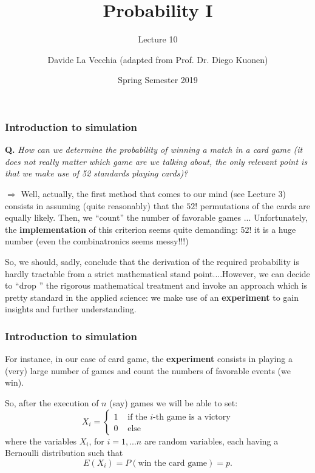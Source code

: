 \documentclass[notes=show,smaller,handout]{beamer}
\begin{document}
\title[S110015]{Probability I}
\subtitle{Lecture 10}
\author[La Vecchia]{Davide La Vecchia (adapted from Prof. Dr. Diego Kuonen)}
\date{Spring Semester 2019}
\maketitle


\begin{frame}
\frametitle{Introduction to simulation}

\color{red} \textbf{Q.} \textit{How can we determine the probability of winning a match in a card game (it does not really matter which game are we talking about, the only relevant point is that we make use of 52 standards playing cards)?} \color{black}

\vspace{1cm}

$\Rightarrow$  Well, actually, the first method that comes to our mind (see Lecture 3) consists in assuming (quite reasonably) that the 
$52!$ permutations of the cards are equally likely. Then, we ``count'' the number of favorable games ... \pause 
Unfortunately, the \textbf{implementation} of this criterion seems quite demanding: $52!$ it is a huge number (even the combinatronics
seems messy!!!)

\vspace{0.4cm}
So, we should, sadly, conclude that  the derivation of the required probability is hardly tractable from a strict mathematical stand point....However, 
we can decide to ``drop '' the rigorous mathematical treatment and invoke an approach which is pretty standard
in the applied science: we make use of an \textbf{experiment} to gain insights and further understanding.


\end{frame}


\begin{frame}
\frametitle{Introduction to simulation}

For instance,  in our case of card game, the \textbf{experiment} consists in playing a (very) large number of games and count the numbers of favorable events (we win).

\vspace{0.4cm}

So, after the execution of $n$ (say) games we will be able to set:
$$
X_i = \left\{\begin{array}{ll}
1& \mbox{ if the $i$-th game is a victory}\\
0 & \mbox{ else}
\end{array}\right.
$$
where the variables $X_i$, for $i=1,...n$ are random variables, each having a Bernoulli distribution such that
$$
E(X_i) = P(\text{win the card game}) = p.
$$

\end{frame}
\end{document}
